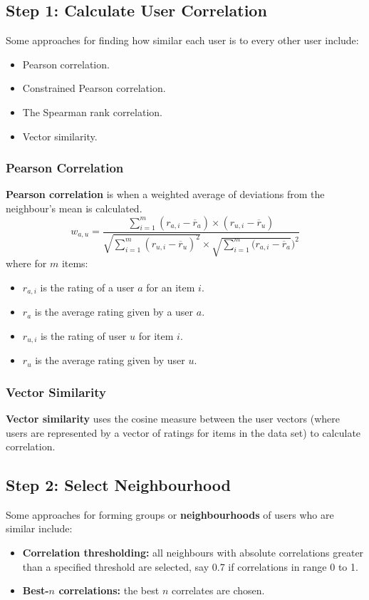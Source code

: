 \documentclass[a4paper,11pt]{article}
\begin{document}
\subsection{Step 1: Calculate User Correlation}
Some approaches for finding how similar each user is to every other user include:
\begin{itemize}
    \item   Pearson correlation.
    \item   Constrained Pearson correlation.
    \item   The Spearman rank correlation.
    \item   Vector similarity.
\end{itemize}

\subsubsection{Pearson Correlation}
\textbf{Pearson correlation} is when a weighted average of deviations from the neighbour's mean is calculated.
\[
    w_{a,u} = \frac{\sum^m_{i=1} (r_{a,i} - \overline{r}_a) \times (r_{u,i} - \overline{r}_u)}
    {\sqrt{\sum^m_{i=1} (r_{u,i} - \overline{r}_u)^2} \times \sqrt{\sum^m_{i=1}(r_{a,i} - \overline{r}_a})^2}
\]
where for $m$ items:
\begin{itemize}
    \item   $r_{a,i}$ is the rating of a user $a$ for an item $i$.
    \item   $r_a$ is the average rating given by a user $a$.
    \item   $r_{u,i}$ is the rating of user $u$ for item $i$.
    \item   $r_u$ is the average rating given by user $u$.
\end{itemize}

\subsubsection{Vector Similarity}
\textbf{Vector similarity} uses the cosine measure between the user vectors (where users are represented by a vector of ratings for items in the data set) to calculate correlation.

\subsection{Step 2: Select Neighbourhood}
Some approaches for forming groups or \textbf{neighbourhoods} of users who are similar include:
\begin{itemize}
    \item   \textbf{Correlation thresholding:} all neighbours with absolute correlations greater than a specified threshold are selected, say 0.7 if correlations in range 0 to 1.
    \item   \textbf{Best-$n$ correlations:} the best $n$ correlates are chosen.
\end{itemize}
\end{document}
